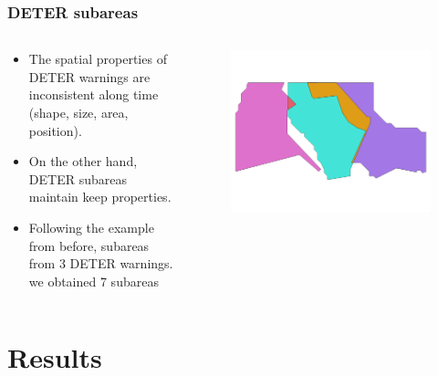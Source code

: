 \documentclass[aspectratio=169]{beamer}
\begin{document}
\begin{frame}
    \frametitle{DETER subareas}
    \begin{columns}
        \begin{column}{0.5\textwidth}
            \begin{itemize}
                \item The spatial properties of DETER warnings are inconsistent
                    along time (shape, size, area, position).
                \item On the other hand, DETER subareas maintain keep properties.
                \item Following the example from before, subareas from 3 DETER
                    warnings. we obtained 7 subareas
            \end{itemize}
        \end{column}
        \begin{column}{0.5\textwidth}
            \begin{figure}[h]
                \includegraphics[width=0.99\linewidth]
                {./images/sample_deter_subareas.png}
            \end{figure}
        \end{column}
    \end{columns}
\end{frame}

\section{Results}
\end{document}
